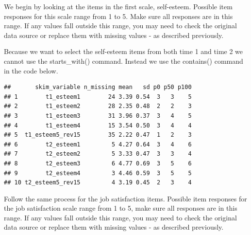 \documentclass[
]{krantz}
\makeatletter
\newenvironment{Shaded}{\begin{snugshade}}{\end{snugshade}}
\newcommand{\KeywordTok}[1]{\textcolor[rgb]{0.27,0.27,0.27}{\textbf{#1}}}
\newcommand{\NormalTok}[1]{#1}
\newcommand{\OperatorTok}[1]{\textcolor[rgb]{0.43,0.43,0.43}{\textbf{#1}}}
\newcommand{\StringTok}[1]{\textcolor[rgb]{0.5,0.5,0.5}{#1}}
\newenvironment{kframe}{%
\medskip{}
\setlength{\fboxsep}{.8em}
 \def\at@end@of@kframe{}%
 \ifinner\ifhmode%
  \def\at@end@of@kframe{\end{minipage}}%
  \begin{minipage}{\columnwidth}%
 \fi\fi%
 \def\FrameCommand##1{\hskip\@totalleftmargin \hskip-\fboxsep
 \colorbox{shadecolor}{##1}\hskip-\fboxsep
     \hskip-\linewidth \hskip-\@totalleftmargin \hskip\columnwidth}%
 \MakeFramed {\advance\hsize-\width
   \@totalleftmargin\z@ \linewidth\hsize
   \@setminipage}}%
 {\par\unskip\endMakeFramed%
 \at@end@of@kframe}
\renewenvironment{Shaded}{\begin{kframe}}{\end{kframe}}
\makeatother
\begin{document}
We begin by looking at the items in the first scale, self-esteem. Possible item responses for this scale range from 1 to 5. Make sure all responses are in this range. If any values fall outside this range, you may need to check the original data source or replace them with missing values - as described previously.

Because we want to select the self-esteem items from both time 1 and time 2 we cannot use the starts\_with() command. Instead we use the contains() command in the code below.

\begin{Shaded}
\end{Shaded}

\begin{verbatim}
##       skim_variable n_missing mean   sd p0 p50 p100
## 1        t1_esteem1        24 3.39 0.54  3   3    5
## 2        t1_esteem2        28 2.35 0.48  2   2    3
## 3        t1_esteem3        31 3.96 0.37  3   4    5
## 4        t1_esteem4        15 3.54 0.50  3   4    4
## 5  t1_esteem5_rev15        35 2.22 0.47  1   2    3
## 6        t2_esteem1         5 4.27 0.64  3   4    6
## 7        t2_esteem2         5 3.33 0.47  3   3    4
## 8        t2_esteem3         6 4.77 0.69  3   5    6
## 9        t2_esteem4         3 4.46 0.59  3   5    5
## 10 t2_esteem5_rev15         4 3.19 0.45  2   3    4
\end{verbatim}

Follow the same process for the job satisfaction items. Possible item responses for the job satisfaction scale range from 1 to 5, make sure all responses are in this range. If any values fall outside this range, you may need to check the original data source or replace them with missing values - as described previously.

\begin{Shaded}
\end{Shaded}
\end{document}
